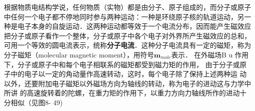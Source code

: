 
根据物质电结构学说，任何物质（实物）都是由分子、原子组成的，而分子或原子中任何一个电子都不停地同时参与两种运动：一种是环绕原子核的轨道运动，另一种是电子本身的自旋运动．这两种运动都等效于一个电流分布，因而能产生磁效应把分子或原子看作一个整体，分子或原子中各个电子对外界所产生磁效应的总和，可用一个等效的圆电流表示，统称\textbf{分子电流}．这种分子电流具有一定的磁矩，称为分子磁矩（molecular magnetic moment），用符号$\mathbf m_{mole}$表示．
在外磁场B u 作用下，分子或原子中和每个电子相联系的磁矩都受到磁力矩的作用，
由于分子或原子中的电子以一定的角动量作高速转动，这时，每个电子除了保持上述两种运
动以外，还要附加电子磁矩以外磁场方向为轴线的转动，称为电子的进动这与力学中所讲
的高速旋转着的陀螺，在重力矩的作用下，以重力方向力轴线所作的进动十分相似（见图8-
49)